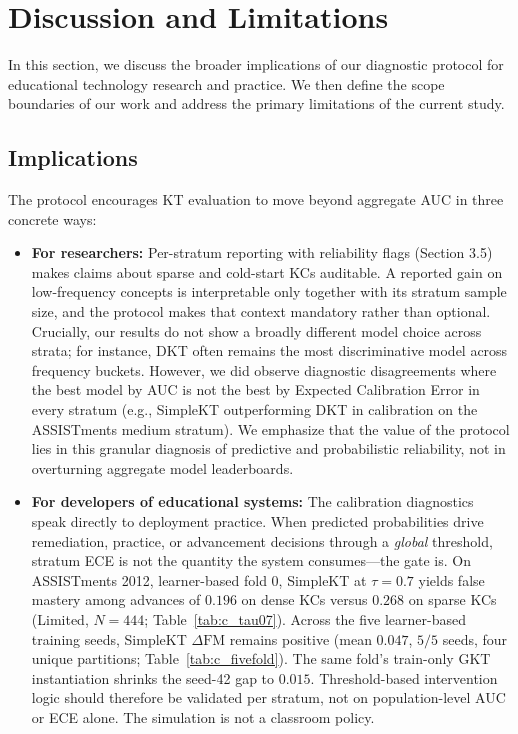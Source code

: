 \section{Discussion and Limitations}
\label{sec:discussion}
In this section, we discuss the broader implications of our diagnostic protocol for educational technology research and practice. We then define the scope boundaries of our work and address the primary limitations of the current study.

\subsection{Implications}
The protocol encourages KT evaluation to move beyond aggregate AUC in three concrete ways:
\begin{itemize}
    \item \textbf{For researchers:} Per-stratum reporting with reliability flags (Section 3.5) makes claims about sparse and cold-start KCs auditable. A reported gain on low-frequency concepts is interpretable only together with its stratum sample size, and the protocol makes that context mandatory rather than optional. Crucially, our results do not show a broadly different model choice across strata; for instance, DKT often remains the most discriminative model across frequency buckets. However, we did observe diagnostic disagreements where the best model by AUC is not the best by Expected Calibration Error in every stratum (e.g., SimpleKT outperforming DKT in calibration on the ASSISTments medium stratum). We emphasize that the value of the protocol lies in this granular diagnosis of predictive and probabilistic reliability, not in overturning aggregate model leaderboards.
    \item \textbf{For developers of educational systems:} The calibration diagnostics speak directly to deployment practice. When predicted probabilities drive remediation, practice, or advancement decisions through a \emph{global} threshold, stratum ECE is not the quantity the system consumes---the gate is. On ASSISTments 2012, learner-based fold 0, SimpleKT at $\tau=0.7$ yields false mastery among advances of $0.196$ on dense KCs versus $0.268$ on sparse KCs (Limited, $N=444$; Table~\ref{tab:c_tau07}). Across the five learner-based training seeds, SimpleKT $\Delta\mathrm{FM}$ remains positive (mean $0.047$, $5/5$ seeds, four unique partitions; Table~\ref{tab:c_fivefold}). The same fold's train-only GKT instantiation shrinks the seed-42 gap to $0.015$. Threshold-based intervention logic should therefore be validated per stratum, not on population-level AUC or ECE alone. The simulation is not a classroom policy.

\end{itemize}
